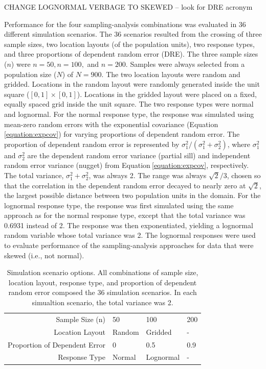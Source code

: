 \documentclass[]{elsarticle} %
\begin{document}
CHANGE LOGNORMAL VERBAGE TO SKEWED -- look for DRE acronym

Performance for the four sampling-analysis combinations was evaluated in
36 different simulation scenarios. The 36 scenarios resulted from the
crossing of three sample sizes, two location layouts (of the population
units), two response types, and three proportions of dependent random
error (DRE). The three sample sizes (\(n\)) were \(n = 50, n = 100,\)
and \(n = 200\). Samples were always selected from a population size
(\(N\)) of \(N = 900\). The two location layouts were random and
gridded. Locations in the random layout were randomly generated inside
the unit square (\([0, 1] \times [0, 1]\)). Locations in the gridded
layout were placed on a fixed, equally spaced grid inside the unit
square. The two response types were normal and lognormal. For the normal
response type, the response was simulated using mean-zero random errors
with the exponential covariance (Equation\(~\)\ref{equation:expcov}) for
varying proportions of dependent random error. The proportion of
dependent random error is represented by
\(\sigma^2_1 / (\sigma^2_1 + \sigma^2_2)\), where \(\sigma^2_1\) and
\(\sigma^2_2\) are the dependent random error variance (partial sill)
and independent random error variance (nugget) from
Equation\(~\)\ref{equation:expcov}, respectively. The total variance,
\(\sigma^2_1 + \sigma^2_2\), was always 2. The range was always
\(\sqrt{2} / 3\), chosen so that the correlation in the dependent random
error decayed to nearly zero at \(\sqrt{2}\), the largest possible
distance between two population units in the domain. For the lognormal
response type, the response was first simulated using the same approach
as for the normal response type, except that the total variance was
0.6931 instead of 2. The response was then exponentiated, yielding a
lognormal random variable whose total variance was 2. The lognormal
responses were used to evaluate performance of the sampling-analysis
approaches for data that were skewed (i.e., not normal).

\begin{table}[ht]
\centering
\begin{tabular}{r|lll}
   \hline
Sample Size (n) & 50 & 100 & 200 \\ 
  Location Layout & Random & Gridded & - \\ 
  Proportion of Dependent Error & 0 & 0.5 & 0.9 \\ 
  Response Type & Normal & Lognormal & - \\ 
   \hline
\end{tabular}
\caption{\label{tab:parmtab} Simulation scenario options. All combinations of sample size, location layout, response type, and proportion of dependent random error composed the 36 simulation scenarios. In each simualtion scenario, the total variance was 2.} 
\end{table}
\end{document}
